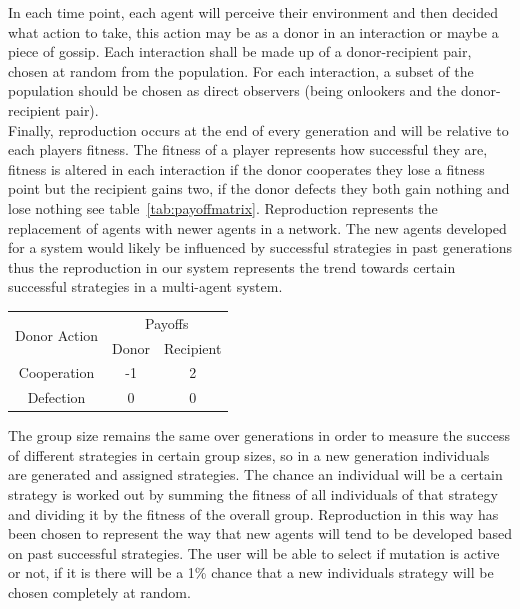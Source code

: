 \documentclass[twoside,twocolumn]{article}
\begin{document}
In each time point, each agent will perceive their environment and then decided what action to take, this action may be as a donor in an interaction or maybe a piece of gossip. Each interaction shall be made up of a donor-recipient pair, chosen at random from the population. For each interaction, a subset of the population should be chosen as direct observers (being onlookers and the donor-recipient pair).\\
Finally, reproduction occurs at the end of every generation and will be relative to each players fitness. The fitness of a player represents how successful they are, fitness is altered in each interaction if the donor cooperates they lose a fitness point but the recipient gains two, if the donor defects they both gain nothing and lose nothing see table~\ref{tab:payoffmatrix}. Reproduction represents the replacement of agents with newer agents in a network. The new agents developed for a system would likely be influenced by successful strategies in past generations thus the reproduction in our system represents the trend towards certain successful strategies in a multi-agent system.\\
\begin{framed}
	\begin{center}
		\label{tab:payoffmatrix}
		\begin{tabular}{c|c|c}
		\multirow{2}{*}{Donor Action} & \multicolumn{2}{c}{Payoffs}\\		
		& Donor & Recipient\\
		\hline
		Cooperation & -1 & 2\\
		\hline
		Defection & 0 & 0\\
		\end{tabular}
	\end{center}	
\end{framed}
The group size remains the same over generations in order to measure the success of different strategies in certain group sizes, so in a new generation individuals are generated and assigned strategies. The chance an individual will be a certain strategy is worked out by summing the fitness of all individuals of that strategy and dividing it by the fitness of the overall group. Reproduction in this way has been chosen to represent the way that new agents will tend to be developed based on past successful strategies. The user will be able to select if mutation is active or not, if it is there will be a 1\% chance that a new individuals strategy will be chosen completely at random.
\end{document}
